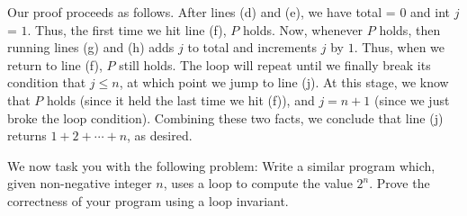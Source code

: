 \documentclass[11pt]{article}
\begin{document}
\begin{enumerate}
        Our proof proceeds as follows. After lines (d) and (e), we have total = $0$ and int $j$ = $1$. Thus, the first time we hit line (f), $P$ holds. Now, whenever $P$ holds, then running lines (g) and (h) adds $j$ to total and increments $j$ by $1$. Thus, when we return to line (f), $P$ still holds. The loop will repeat until we finally break its condition that $j\leq n$, at which point we jump to line (j). At this stage, we know that $P$ holds (since it held the last time we hit (f)), and $j=n+1$ (since we just broke the loop condition). Combining these two facts, we conclude that line (j) returns $1+2+\cdots + n$, as desired.

        We now task you with the following problem: Write a similar program which, given non-negative integer $n$, uses a loop to compute the value $2^n$. Prove the correctness of your program using a loop invariant.
\fi
        
\end{enumerate}
\end{document}
